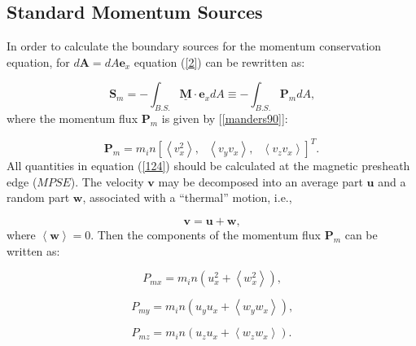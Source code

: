 \documentclass[11pt]{article}
\begin{document}
\bigskip

\subsection{Standard Momentum Sources}

\bigskip

In order to calculate the boundary sources for the momentum conservation
equation, for $d\mathbf{A}=dA\mathbf{e}_{x}$ equation (\ref{2}) can be
rewritten as:

\begin{equation}
\mathbf{S}_{m}=-\int_{B.S.}\underline{\mathbf{M}}\cdot\mathbf{e}%
_{x}dA\equiv-\int_{B.S.}\mathbf{P}_{m}dA\text{,}   \label{123}
\end{equation}
where the momentum flux $\mathbf{P}_{m}$ is given by [\ref{manders90}]:

\begin{equation}
\mathbf{P}_{m}=m_{i}n\left[ \left\langle v_{x}^{2}\right\rangle ,\text{ }%
\left\langle v_{y}v_{x}\right\rangle ,\text{ }\left\langle
v_{z}v_{x}\right\rangle \right] ^{T}\text{.}   \label{124}
\end{equation}
All quantities in equation (\ref{124}) should be calculated at the magnetic
presheath edge ($MPSE$). The velocity $\mathbf{v}$ may be decomposed into an
average part $\mathbf{u}$ and a random part $\mathbf{w}$, associated with a
``thermal'' motion, i.e.,

\begin{equation}
\mathbf{v=u+w}\text{,}   \label{125}
\end{equation}
where $\left\langle \mathbf{w}\right\rangle =0$. Then the components of the
momentum flux $\mathbf{P}_{m}$ can be written as:

\begin{equation}
P_{mx}=m_{i}n\left( u_{x}^{2}+\left\langle w_{x}^{2}\right\rangle \right) 
\text{,}   \label{126}
\end{equation}

\begin{equation}
P_{my}=m_{i}n\left( u_{y}u_{x}+\left\langle w_{y}w_{x}\right\rangle \right) 
\text{,}   \label{127}
\end{equation}

\begin{equation}
P_{mz}=m_{i}n\left( u_{z}u_{x}+\left\langle w_{z}w_{x}\right\rangle \right) 
\text{.}   \label{128}
\end{equation}

\bigskip
\end{document}
